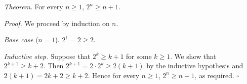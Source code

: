 \textit{Theorem.} For every $n \geq 1$, $2^{n} \geq n + 1$.

\textit{Proof.} We proceed by induction on $n$.

\textit{Base case} ($n = 1$). $2^{1} = 2 \geq 2$.

\textit{Inductive step.} Suppose that $2^{k} \geq k + 1$ for some $k \geq 1$.
We show that $2^{k + 1} \geq k + 2$.
Then $2^{k + 1} = 2 \cdot 2^{k} \geq 2(k + 1)$ by the inductive hypothesis and $2(k + 1) = 2k + 2 \geq k + 2$.
Hence for every $n \geq 1$, $2^{n} \geq n + 1$, as required. \hfill$\square$